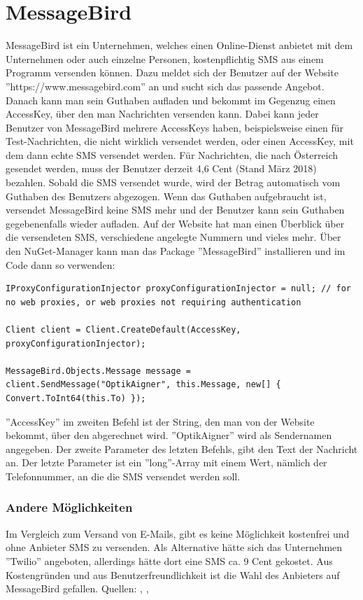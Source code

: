 \section{MessageBird}
MessageBird ist ein Unternehmen, welches einen Online-Dienst anbietet mit dem  Unternehmen oder auch einzelne Personen, kostenpflichtig SMS aus einem Programm versenden können. Dazu meldet sich der Benutzer auf der Website ''https://www.messagebird.com'' an und sucht sich das passende Angebot. Danach kann man sein Guthaben aufladen und bekommt im Gegenzug einen AccessKey, über den man Nachrichten versenden kann. Dabei kann jeder Benutzer von MessageBird mehrere AccessKeys haben, beispielsweise einen für Test-Nachrichten, die nicht wirklich versendet werden, oder einen AccessKey, mit dem dann echte SMS versendet werden. Für Nachrichten, die nach Österreich gesendet werden, muss der Benutzer derzeit 4,6 Cent (Stand März 2018) bezahlen. Sobald die SMS versendet wurde, wird der Betrag automatisch vom Guthaben des Benutzers abgezogen. Wenn das Guthaben aufgebraucht ist, versendet MessageBird keine SMS mehr und der Benutzer kann sein Guthaben gegebenenfalls wieder aufladen. Auf der Website hat man einen Überblick über die versendeten SMS, verschiedene angelegte Nummern und vieles mehr. \newline Über den NuGet-Manager kann man das Package ''MessageBird'' installieren und im Code dann so verwenden:
\begin{lstlisting}
IProxyConfigurationInjector proxyConfigurationInjector = null; // for no web proxies, or web proxies not requiring authentication

Client client = Client.CreateDefault(AccessKey, proxyConfigurationInjector);

MessageBird.Objects.Message message = client.SendMessage("OptikAigner", this.Message, new[] { Convert.ToInt64(this.To) });
\end{lstlisting}
''AccessKey'' im zweiten Befehl ist der String, den man von der Website bekommt, über den abgerechnet wird. ''OptikAigner'' wird als Sendernamen angegeben. Der zweite Parameter des letzten Befehls, gibt den Text der Nachricht an. Der letzte Parameter ist ein ''long''-Array mit einem Wert, nämlich der Telefonnummer, an die die SMS versendet werden soll.

\subsubsection{Andere Möglichkeiten}
Im Vergleich zum Versand von E-Mails, gibt es keine Möglichkeit kostenfrei und ohne Anbieter SMS zu versenden. Als Alternative hätte sich das Unternehmen ''Twilio'' angeboten, allerdings hätte dort eine SMS ca. 9 Cent gekostet. Aus Kostengründen und aus Benutzerfreundlichkeit ist die Wahl des Anbieters auf MessageBird gefallen.
\newline Quellen: \cite{messagebird_sms_2018}, \cite{messagebird_preise_2018}, \cite{twilio_sms_2018}